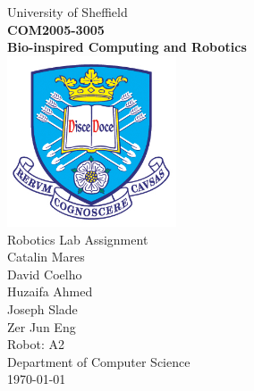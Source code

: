 \documentclass[hidelinks,a4paper,11pt]{article}
\begin{document}
\begin{titlepage}

\begin{center}
{\LARGE University of Sheffield}\\[1cm]
\huge {\bfseries COM2005-3005\\Bio-inspired Computing and Robotics}\\[1cm]
\includegraphics[width=5cm]{tuoslogo.png}\\[1cm]
{\LARGE Robotics Lab Assignment}\\[2cm]


{\Large Catalin	Mares}\\
{\Large David Coelho}\\
{\Large Huzaifa	Ahmed}\\
{\Large Joseph Slade}\\
{\Large Zer Jun Eng}\\[1cm]

{\LARGE Robot: A2}\\[1cm]

{\LARGE Department of Computer Science}\\
{\Large \today}
\end{center}

\end{titlepage}

\tableofcontents
\newpage
\end{document}
